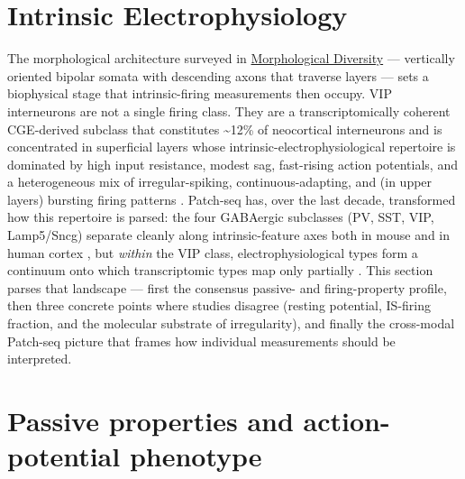 \documentclass[11pt]{article}
\begin{document}
\section{Intrinsic Electrophysiology}
\label{sec:05_electrophysiology}

The morphological architecture surveyed in \href{/morphology}{Morphological Diversity} --- vertically oriented bipolar somata with descending axons that traverse layers --- sets a biophysical stage that intrinsic-firing measurements then occupy. VIP interneurons are not a single firing class. They are a transcriptomically coherent CGE-derived subclass that constitutes {\textasciitilde}12\% of neocortical interneurons and is concentrated in superficial layers \citep{Lim2018, Tasic2018, Yao2021a, Machold2023} whose intrinsic-electrophysiological repertoire is dominated by high input resistance, modest sag, fast-rising action potentials, and a heterogeneous mix of irregular-spiking, continuous-adapting, and (in upper layers) bursting firing patterns \citep{Tremblay2016, Pronneke2015, Cauli1997}. Patch-seq has, over the last decade, transformed how this repertoire is parsed: the four GABAergic subclasses (PV, SST, VIP, Lamp5/Sncg) separate cleanly along intrinsic-feature axes both in mouse \citep{Gouwens2020a, Gouwens2019} and in human cortex \citep{Kim2023}, but \textit{within} the VIP class, electrophysiological types form a continuum onto which transcriptomic types map only partially \citep{Scala2021, Gouwens2020a}. This section parses that landscape --- first the consensus passive- and firing-property profile, then three concrete points where studies disagree (resting potential, IS-firing fraction, and the molecular substrate of irregularity), and finally the cross-modal Patch-seq picture that frames how individual measurements should be interpreted.

\section{Passive properties and action-potential phenotype}\label{sec-05-passive-aps}
\end{document}
